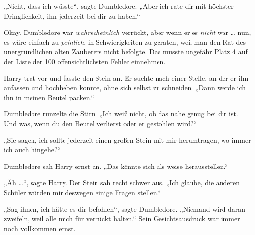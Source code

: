 „Nicht, dass ich wüsste“, sagte Dumbledore.
„Aber ich rate dir mit höchster Dringlichkeit, ihn jederzeit bei dir zu haben.“

Okay. Dumbledore war \emph{wahrscheinlich} verrückt, aber wenn er es \emph{nicht} war … nun, es wäre einfach zu \emph{peinlich}, in Schwierigkeiten zu geraten, weil man den Rat des unergründlichen alten Zauberers nicht befolgte. Das musste ungefähr Platz 4 auf der Liste der 100 offensichtlichsten Fehler einnehmen.

Harry trat vor und fasste den Stein an. Er suchte nach einer Stelle, an der er ihn anfassen und hochheben konnte, ohne sich selbst zu schneiden.
„Dann werde ich ihn in meinen Beutel packen.“

Dumbledore runzelte die Stirn.
„Ich weiß nicht, ob das nahe genug bei dir ist. Und was, wenn du den Beutel verlierst oder er gestohlen wird?“

„Sie sagen, ich sollte jederzeit einen großen Stein mit mir herumtragen, wo immer ich auch hingehe?“

Dumbledore sah Harry ernst an.
„Das könnte sich als weise herausstellen.“

„Äh …“, sagte Harry. Der Stein sah recht schwer aus.
„Ich glaube, die anderen Schüler würden mir deswegen einige Fragen stellen.“

„Sag ihnen, ich hätte es dir befohlen“, sagte Dumbledore.
„Niemand wird daran zweifeln, weil alle mich für verrückt halten.“ Sein Gesichtsausdruck war immer noch vollkommen ernst.

